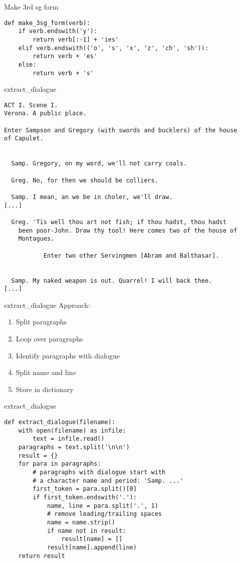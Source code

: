 \documentclass[aspectratio=169,usenames,dvipsnames]{beamer}
\begin{document}
\begin{frame}[fragile]{Make 3rd sg form}
\begin{lstlisting}
def make_3sg_form(verb):
    if verb.endswith('y'):
        return verb[:-1] + 'ies'
    elif verb.endswith(('o', 's', 'x', 'z', 'ch', 'sh')):
        return verb + 'es'
    else:
        return verb + 's'
\end{lstlisting}
\end{frame}


\begin{frame}[fragile]{extract\_dialogue}
\scriptsize
\begin{verbatim}
ACT I. Scene I.
Verona. A public place.

Enter Sampson and Gregory (with swords and bucklers) of the house
of Capulet.


  Samp. Gregory, on my word, we'll not carry coals.

  Greg. No, for then we should be colliers.

  Samp. I mean, an we be in choler, we'll draw.
[...]

  Greg. 'Tis well thou art not fish; if thou hadst, thou hadst
    been poor-John. Draw thy tool! Here comes two of the house of
    Montagues.

           Enter two other Servingmen [Abram and Balthasar].


  Samp. My naked weapon is out. Quarrel! I will back thee.
[...]
\end{verbatim}
\end{frame}

\begin{frame}[fragile]{extract\_dialogue}
    Approach:
    \begin{enumerate}
        \item Split paragraphs
        \item Loop over paragraphs
        \item Identify paragraphs with dialogue
        \item Split name and line
        \item Store in dictionary
    \end{enumerate}
\end{frame}

\begin{frame}[fragile]{extract\_dialogue}
\begin{lstlisting}
def extract_dialogue(filename):
    with open(filename) as infile:
        text = infile.read()
    paragraphs = text.split('\n\n')
    result = {}
    for para in paragraphs:
        # paragraphs with dialogue start with
        # a character name and period: 'Samp. ...'
        first_token = para.split()[0]
        if first_token.endswith('.'):
            name, line = para.split('.', 1)
            # remove leading/trailing spaces
            name = name.strip()
            if name not in result:
                result[name] = []
            result[name].append(line)
    return result
\end{lstlisting}
\end{frame}
\end{document}
